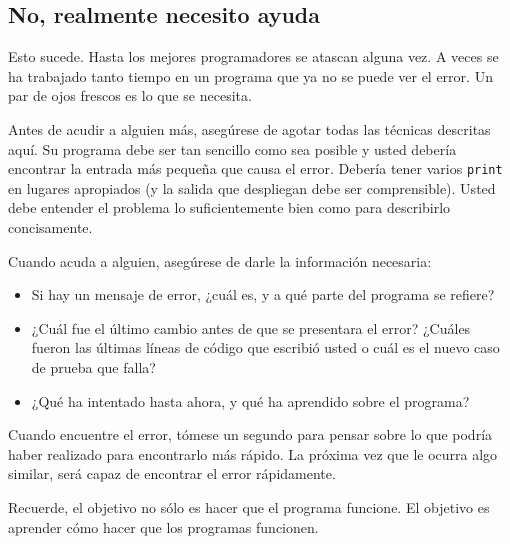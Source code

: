 \subsection{No, realmente necesito ayuda}

Esto sucede. Hasta los mejores programadores se atascan alguna vez.
A veces se ha trabajado tanto tiempo en un programa que ya no se puede
ver el error. Un par de ojos frescos es lo que se necesita.

Antes de acudir a alguien más, asegúrese de agotar todas las técnicas
descritas aquí. Su programa debe ser tan sencillo como sea posible
y usted debería encontrar la entrada más pequeña que causa el error.
Debería tener varios \texttt{print} en lugares apropiados (y la salida
que despliegan debe ser comprensible). Usted debe entender el problema
lo suficientemente bien como para describirlo concisamente.

Cuando acuda a alguien, asegúrese de darle la información necesaria:
\begin{itemize}
\item Si hay un mensaje de error, ¿cuál es, y a qué parte del programa se
refiere?
\item ¿Cuál fue el último cambio antes de que se presentara el error? ¿Cuáles
fueron las últimas líneas de código que escribió usted o cuál es el
nuevo caso de prueba que falla?
\item ¿Qué ha intentado hasta ahora, y qué ha aprendido sobre el programa?
\end{itemize}
Cuando encuentre el error, tómese un segundo para pensar sobre lo
que podría haber realizado para encontrarlo más rápido. La próxima
vez que le ocurra algo similar, será capaz de encontrar el error rápidamente.

Recuerde, el objetivo no sólo es hacer que el programa funcione. El
objetivo es aprender cómo hacer que los programas funcionen.
